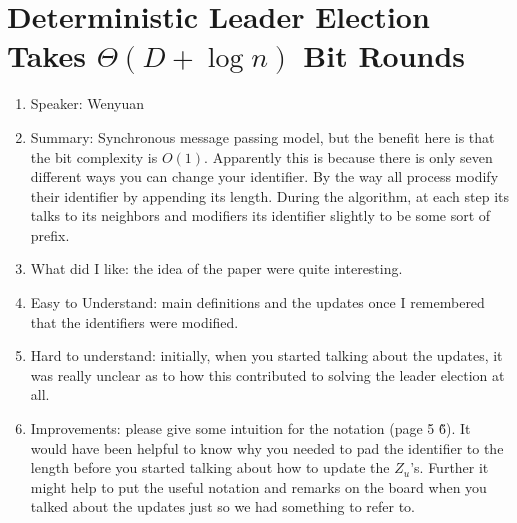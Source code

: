 \documentclass[twoside]{article}
\begin{document}
\section{Deterministic Leader Election Takes $\Theta(D + \log n)$ Bit Rounds}
\begin{enumerate}
\item Speaker: Wenyuan
\item Summary: Synchronous message passing model, but the benefit here is that the bit complexity is $O(1)$. Apparently this is because there is only seven different ways you can change your identifier. By the way all process modify their identifier by appending its length. During the algorithm, at each step its talks to its neighbors  and modifiers its identifier slightly to be some sort of prefix. 
\item What did I like: the idea of the paper were quite interesting.
\item Easy to Understand: main definitions and the updates once I remembered that the identifiers were modified.
\item Hard to understand: initially, when you started talking about the updates, it was really unclear as to how this contributed to solving the leader election at all.
\item Improvements: please give some intuition for the notation (page 5 \~ 6). It would have been helpful to know why you needed to pad the identifier to the length before you started talking about how to update the $Z_u$'s. Further it might help to put the useful notation and remarks on the board when you talked about the updates just so we had something to refer to.
\end{enumerate}
\end{document}
